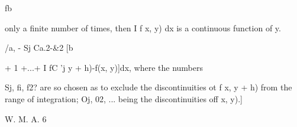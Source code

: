 fb

only a finite number of times, then I f x, y) dx is a continuous
function of y.

/a, - Sj Ca.2-\&2 [b

+ 1 +...+ I fC 'j y + h)-f(x, y)]dx, where the numbers

Sj,   fi, f2?  are so chosen as to exclude the
discontinuities ot f x, y + h) from the range of integration; Oj, 02,
... being the discontinuities off x, y).] 

W. M. A. 6

